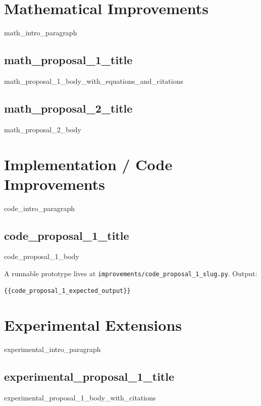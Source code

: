 \documentclass[11pt]{article}
\title{Proposed Improvements to \citet{ {{bibkey}} }}
\author{Forward-thinking proposals}
\date{Studied: {{date}} \\ \texttt{ {{arxiv_id}} }}
\begin{document}
\maketitle

\begin{abstract}
{{abstract_paragraph}}
\end{abstract}

\section*{Mathematical Improvements}

{{math_intro_paragraph}}

\subsection*{ {{math_proposal_1_title}} }
{{math_proposal_1_body_with_equations_and_citations}}

\subsection*{ {{math_proposal_2_title}} }
{{math_proposal_2_body}}

\section*{Implementation / Code Improvements}

{{code_intro_paragraph}}

\subsection*{ {{code_proposal_1_title}} }
{{code_proposal_1_body}}

A runnable prototype lives at \texttt{improvements/{{code_proposal_1_slug}}.py}. Output:
\begin{lstlisting}
{{code_proposal_1_expected_output}}
\end{lstlisting}

\section*{Experimental Extensions}

{{experimental_intro_paragraph}}

\subsection*{ {{experimental_proposal_1_title}} }
{{experimental_proposal_1_body_with_citations}}
\end{document}
